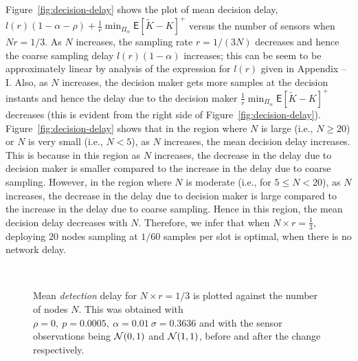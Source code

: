 \documentclass[acmtosn]{acmtrans2m}
\newcommand{\EXP}[1]{\mathsf{E}\!\left[#1\right]}
\begin{document}
Figure~\ref{fig:decision-delay} shows the plot of mean decision delay, $l(r)(1-\alpha-\rho) 
 + \frac{1}{r}\min_{\Pi_\alpha}\EXP{\widetilde{K}-K}^+$ versus the 
number of sensors when $Nr = 1/3$. As $N$ increases, the sampling rate $r = 1/(3N)$ 
decreases and hence the coarse sampling delay $l(r) (1-\alpha)$ increases; this 
can be seem to be approximately linear by analysis of the expression for $l(r)$ given
in Appendix -- I. Also, 
as $N$ increases, the decision maker gets more samples at the decision instants and 
hence the delay due to the decision maker 
$\frac{1}{r}\min_{\Pi_\alpha}\EXP{\widetilde{K}-K}^+$ decreases (this is evident 
from the right side of Figure~\ref{fig:decision-delay}). Figure~\ref{fig:decision-delay} 
shows that in the region where $N$ is large (i.e., $N \geqslant 20$) 
or $N$ is very small (i.e., $N < 5$), as $N$ increases, the mean 
decision delay increases. This is because in this region as $N$ increases, the decrease 
in the delay due to decision maker is smaller compared to the increase in the delay due 
to coarse sampling. However, in the region where $N$ is moderate (i.e., for $5 \leqslant N < 20$), as $N$ 
increases, the decrease in the delay due to decision maker is large compared to the 
increase in the delay due to coarse sampling. Hence in this region, the mean decision 
delay decreases with $N$. Therefore, we infer that when $N\times r =\frac{1}{3}$,
deploying $20$ nodes sampling at $1/60$ samples per slot is optimal, when there is no 
network delay.

\begin{figure}[t]
   \centering \ 
   \caption{Mean \emph{detection} delay for $N\times r=1/3$ is plotted
     against the number of nodes $N$. This was obtained with
     $\rho=0,~p=0.0005,~\alpha=0.01~\sigma=0.3636$ and with the sensor
     observations being ${\cal{N}}(0,1)$ and ${\cal{N}}(1,1)$, before
     and after the change respectively.}
   \label{fig:detection-delay}
 \end{figure}
\end{document}
